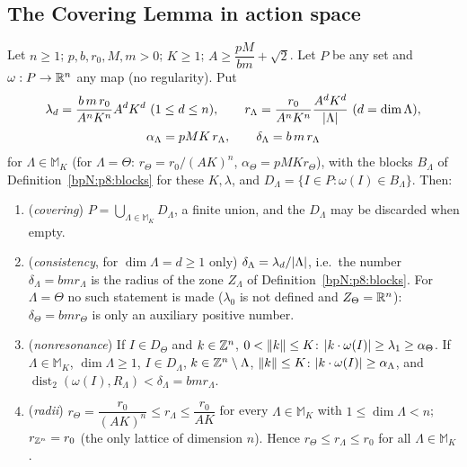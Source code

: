 \subsection{The Covering Lemma in action space}\label{bpN:p8:s-covering}

\begin{lemma}\label{bpN:p8:covering}
Let $n\ge1$; $p,b,r_0,M,m>0$; $K\ge1$; $A\ge\dfrac{pM}{bm}+\sqrt2$. Let $P$ be any set and $\omega:P\to\mathbb{R}^n$ any map (no regularity). Put
\begin{gather*}\lambda_d=\frac{b\,m\,r_0}{A^nK^n}A^dK^d\ (1\le d\le n),\qquad r_\Lambda=\frac{r_0}{A^nK^n}\frac{A^dK^d}{\abs\Lambda}\ (d=\dim\Lambda),\\\alpha_\Lambda=pMK\,r_\Lambda,\qquad\delta_\Lambda=b\,m\,r_\Lambda\end{gather*}
for $\Lambda\in\mathbb M_K$ (for $\Lambda=\Theta$: $r_\Theta=r_0/(AK)^n$, $\alpha_\Theta=pMKr_\Theta$), with the blocks $B_\Lambda$ of Definition~\ref{bpN:p8:blocks} for these $K,\lambda$, and $D_\Lambda=\{I\in P:\omega(I)\in B_\Lambda\}$. Then:
\begin{enumerate}[label=(\alph*)]
\item (\emph{covering}) $P=\bigcup_{\Lambda\in\mathbb M_K}D_\Lambda$, a finite union, and the $D_\Lambda$ may be discarded when empty.
\item (\emph{consistency}, for $\dim\Lambda=d\ge1$ only) $\delta_\Lambda=\lambda_d/\lvert \Lambda\rvert$, i.e.\ the number $\delta_\Lambda=bmr_\Lambda$ is the radius of the zone $Z_\Lambda$ of Definition~\ref{bpN:p8:blocks}. For $\Lambda=\Theta$ no such statement is made ($\lambda_0$ is not defined and $Z_\Theta=\mathbb{R}^n$): $\delta_\Theta=bmr_\Theta$ is only an auxiliary positive number.
\item (\emph{nonresonance}) If $I\in D_\Theta$ and $k\in\mathbb{Z}^n$, $0<\lVert k\rVert\le K$: $\lvert k\cdot\omega(I)\rvert\ge\lambda_1\ge\alpha_\Theta$. If $\Lambda\in\mathbb M_K$, $\dim\Lambda\ge1$, $I\in D_\Lambda$, $k\in\mathbb{Z}^n\setminus\Lambda$, $\lVert k\rVert\le K$: $\lvert k\cdot\omega(I)\rvert\ge\alpha_\Lambda$, and $\operatorname{dist}_2(\omega(I),R_\Lambda)<\delta_\Lambda=bmr_\Lambda$.
\item (\emph{radii}) $r_\Theta=\dfrac{r_0}{(AK)^n}\le r_\Lambda\le\dfrac{r_0}{AK}$ for every $\Lambda\in\mathbb M_K$ with $1\le\dim\Lambda<n$; $r_{\mathbb{Z}^n}=r_0$ (the only lattice of dimension $n$). Hence $r_\Theta\le r_\Lambda\le r_0$ for all $\Lambda\in\mathbb M_K$.
\end{enumerate}
\end{lemma}
